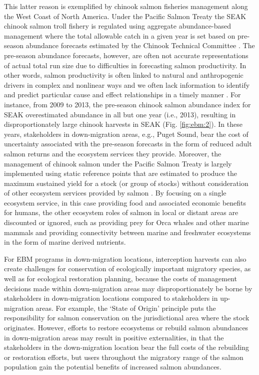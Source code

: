 This latter reason is exemplified by chinook salmon fisheries management along
the West Coast of North America. Under the Pacific Salmon Treaty the SEAK
chinook salmon troll fishery is regulated using aggregate abundance-based
management where the total allowable catch in a given year is set based on
pre-season abundance forecasts estimated by the Chinook Technical Committee
\citep[Annex IV, Chapter 3, Section 6, pg. 66]{PST2014}. The pre-season
abundance forecasts, however, are often not accurate representations of actual
total run size due to difficulties in forecasting salmon productivity. In other
words, salmon productivity is often linked to natural and anthropogenic drivers
in complex and nonlinear ways and we often lack information to identify and
predict particular cause and effect relationships in a timely manner
\citep{Peterman2012, Malick2016a, Myers1998b}. For instance, from 2009 to 2013,
the pre-season chinook salmon abundance index for SEAK overestimated abundance
in all but one year (i.e., 2013), resulting in disproportionately large chinook
harvests in SEAK \citep{CTC2015a} (Fig. \ref{fig:ebm:2}). In these years,
stakeholders in down-migration areas, e.g., Puget Sound, bear the cost of
uncertainty associated with the pre-season forecasts in the form of reduced
adult salmon returns and the ecosystem services they provide. Moreover, the
management of chinook salmon under the Pacific Salmon Treaty is largely
implemented using static reference points that are estimated to produce the
maximum sustained yield for a stock (or group of stocks) without consideration
of other ecosystem services provided by salmon \citep{CTC2015b}. By focusing on
a single ecosystem service, in this case providing food and associated economic
benefits for humans, the other ecosystem roles of salmon in local or distant
areas are discounted or ignored, such as providing prey for Orca whales and
other marine mammals and providing connectivity between marine and freshwater
ecosystems in the form of marine derived nutrients.

For EBM programs in down-migration locations, interception harvests can
also create challenges for conservation of ecologically important
migratory species, as well as for ecological restoration planning,
because the costs of management decisions made within down-migration
areas may disproportionately be borne by stakeholders in down-migration
locations compared to stakeholders in up-migration areas. For example,
the `State of Origin' principle puts the responsibility for salmon
conservation on the jurisdictional area where the stock originates.
However, efforts to restore ecosystems or rebuild salmon abundances in
down-migration areas may result in positive externalities, in that the
stakeholders in the down-migration location bear the full costs of the
rebuilding or restoration efforts, but users throughout the migratory
range of the salmon population gain the potential benefits of increased
salmon abundances.


